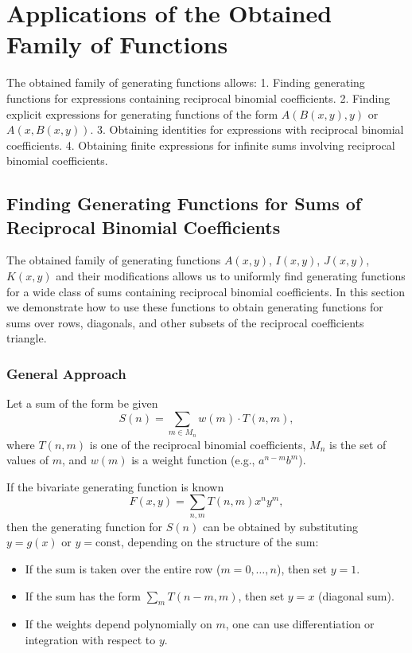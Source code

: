 \documentclass[12pt]{article}
\begin{document}
\section{Applications of the Obtained Family of Functions}

The obtained family of generating functions allows:
1. Finding generating functions for expressions containing reciprocal binomial coefficients.
2. Finding explicit expressions for generating functions of the form $A(B(x,y),y)$ or $A(x,B(x,y))$.
3. Obtaining identities for expressions with reciprocal binomial coefficients.
4. Obtaining finite expressions for infinite sums involving reciprocal binomial coefficients.

\subsection{Finding Generating Functions for Sums of Reciprocal Binomial Coefficients}

The obtained family of generating functions \( A(x,y) \), \( I(x,y) \), \( J(x,y) \), \( K(x,y) \) and their modifications allows us to uniformly find generating functions for a wide class of sums containing reciprocal binomial coefficients. In this section we demonstrate how to use these functions to obtain generating functions for sums over rows, diagonals, and other subsets of the reciprocal coefficients triangle.

\subsubsection{General Approach}

Let a sum of the form be given
\[
S(n) = \sum_{m \in M_n} w(m) \cdot T(n,m),
\]
where \( T(n,m) \) is one of the reciprocal binomial coefficients, \( M_n \) is the set of values of \( m \), and \( w(m) \) is a weight function (e.g., $a^{n-m} b^m$).

If the bivariate generating function is known
\[
F(x,y) = \sum_{n,m} T(n,m) x^n y^m,
\]
then the generating function for \( S(n) \) can be obtained by substituting \( y = g(x) \) or \( y = \text{const} \), depending on the structure of the sum:
\begin{itemize}
\item If the sum is taken over the entire row (\( m = 0,\dots,n \)), then set \( y = 1 \).
\item If the sum has the form \( \sum_{m} T(n-m, m) \), then set \( y = x \) (diagonal sum).
\item If the weights depend polynomially on \( m \), one can use differentiation or integration with respect to \( y \).
\end{itemize}
\end{document}
